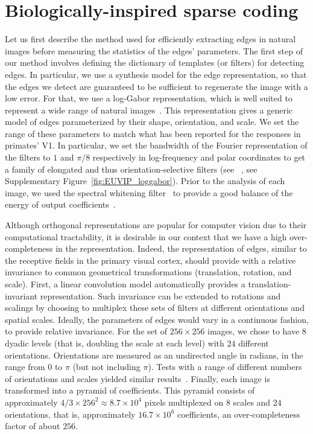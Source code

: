 \documentclass[a4paper, 10pt, twocolumns]{article}
\begin{document}
\section{Biologically-inspired sparse coding}
Let us first describe the method used for efficiently extracting edges in natural images before measuring the statistics of the edges' parameters. The first step of our method involves defining the dictionary of templates (or filters) for detecting edges. In particular, we use a synthesis model for the edge representation, so that the edges we detect are guaranteed to be sufficient to regenerate the image with a low error. For that, we use a log-Gabor representation, which is well suited to represent a wide range of natural images~\citep{Fischer07}. This representation gives a generic model of edges parameterized by their shape, orientation, and scale. We set the range of these parameters to match what has been reported for the responses in primates' V1. In particular, we set the bandwidth of the Fourier representation of the filters to $1$ and $\pi/8$ respectively in log-frequency and polar coordinates to get a family of elongated and thus orientation-selective filters (see~\citep{Fischer07cv}\if{} , see Supplementary Figure~\ref{fig:EUVIP_loggabor}\fi). Prior to the analysis of each image, we used the spectral whitening filter~\citep{Olshausen97} to provide a good balance of the energy of output coefficients~\citep{Perrinet03ieee,Fischer07}.

Although orthogonal representations are popular for computer vision due to their computational tractability, it is desirable in our context that we have a high over-completeness in the representation. Indeed, the representation of edges, similar to the receptive fields in the primary visual cortex, should provide with a relative invariance to common geometrical transformations (translation, rotation, and scale). First, a linear convolution model automatically provides a translation-invariant representation. Such invariance can be extended to rotations and scalings by choosing to multiplex these sets of filters at different orientations and spatial scales. Ideally, the parameters of edges would vary in a continuous fashion, to provide relative invariance. For the set of $256\times 256$ images, we chose to have $8$ dyadic levels (that is, doubling the scale at each level) with $24$ different orientations. Orientations are measured as an undirected angle in radians, in the range from $0$ to $\pi$ (but not including $\pi$). Tests with a range of different numbers of orientations and scales yielded similar results~\citep{Perrinet15bicv}. Finally, each image is transformed into a pyramid of coefficients. This pyramid consists of approximately $4/3\times256^{2}\approx8.7\times10^4$ pixels multiplexed on $8$ scales and $24$ orientations, that is, approximately $16.7\times10^6$ coefficients, an over-completeness factor of about $256$.
\end{document}
